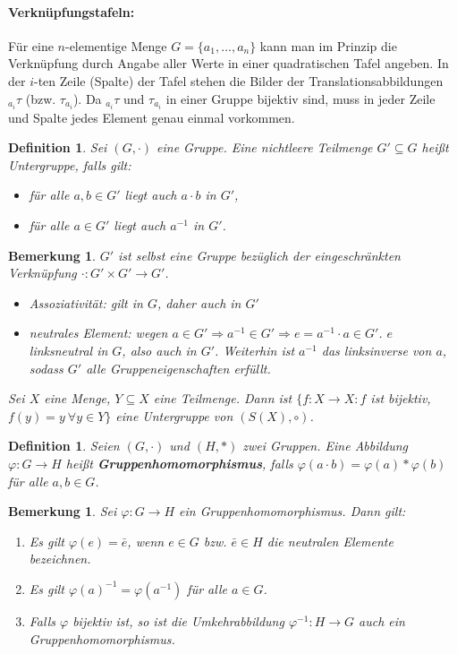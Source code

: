 \documentclass[12pt,a4paper]{article}
\theoremstyle{plain}
\newtheorem{Definition}[Theorem]{Definition}
\newtheorem{Bemerkung}[Theorem]{Bemerkung}
\newcommand{\herv}[1]{{\emph{\textbf{#1}}}}
\numberwithin{equation}{section}
\begin{document}
\paragraph{Verknüpfungstafeln:} Für eine $n$-elementige Menge $G=\{a_1,\ldots,a_n\}$ kann man im Prinzip die Verknüpfung durch Angabe aller Werte in einer quadratischen Tafel angeben. In der $i$-ten Zeile (Spalte) der Tafel stehen die Bilder der Translationsabbildungen ${}_{a_{i}}\tau$ (bzw. $\tau_{a_i}$). Da ${}_{a_{i}}\tau$ und $\tau_{a_i}$ in einer Gruppe bijektiv sind, muss in jeder Zeile und Spalte jedes Element genau einmal vorkommen.
\begin{Definition}
Sei $(G,\cdot)$ eine Gruppe. Eine nichtleere Teilmenge $G'\subseteq G$ heißt Untergruppe, falls gilt:
\begin{itemize}
\item für alle $a,b\in G'$ liegt auch $a\cdot b$ in $G'$,
\item für alle $a\in G'$ liegt auch $a^{-1}$ in $G'$.
\end{itemize}
\end{Definition}
\begin{Bemerkung}
$G'$ ist selbst eine Gruppe bezüglich der eingeschränkten Verknüpfung $\cdot:G'\times G' \rightarrow G'$.
\begin{itemize}
\item Assoziativität: gilt in $G$, daher auch in $G'$
\item neutrales Element: wegen $a\in G' \Rightarrow a^{-1}\in G' \Rightarrow e=a^{-1}\cdot a\in G'$. $e$ linksneutral in $G$, also auch in $G'$. Weiterhin ist $a^{-1}$ das linksinverse von $a$, sodass $G'$ alle Gruppeneigenschaften erfüllt.
\end{itemize}
Sei $X$ eine Menge, $Y\subseteq X$ eine Teilmenge. Dann ist $\{f:X\rightarrow X: f$ ist bijektiv, $f(y)=y\ \forall y\in Y\}$ eine Untergruppe von $(S(X),\circ)$.
\end{Bemerkung}
\begin{Definition}
Seien $(G,\cdot)$ und $(H,*)$ zwei Gruppen. Eine Abbildung $\varphi: G\rightarrow H$ heißt \herv{Gruppenhomomorphismus}, falls $\varphi(a\cdot b)=\varphi(a)*\varphi(b)$ für alle $a,b\in G$.
\end{Definition}
\begin{Bemerkung}
Sei $\varphi:G\rightarrow H$ ein Gruppenhomomorphismus. Dann gilt:
\begin{enumerate}
\renewcommand{\labelenumi}{(\alph{enumi})}
\item Es gilt $\varphi(e)=\bar{e}$, wenn $e\in G$ bzw. $\bar{e}\in H$ die neutralen Elemente bezeichnen.
\item Es gilt $\varphi(a)^{-1}=\varphi(a^{-1})$ für alle $a\in G$.
\item Falls $\varphi$ bijektiv ist, so ist die Umkehrabbildung $\varphi^{-1}:H\rightarrow G$ auch ein Gruppenhomomorphismus.
\end{enumerate}
\end{Bemerkung}
\end{document}
